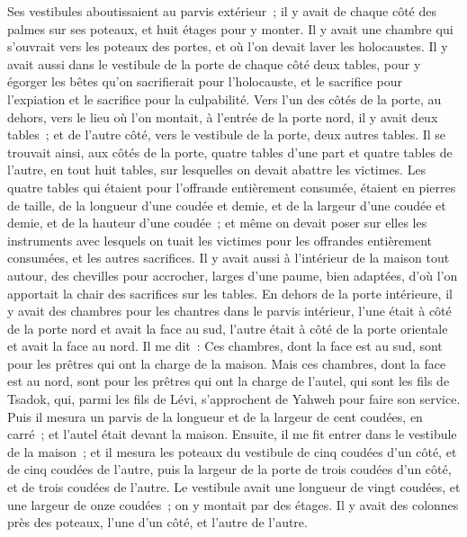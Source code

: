 \begin{multicols}{2}
Ses vestibules aboutissaient au parvis extérieur~; il y avait de chaque côté des palmes sur ses poteaux, et huit étages pour y monter.
Il y avait une chambre qui s'ouvrait vers les poteaux des portes, et où l'on devait laver les holocaustes.
Il y avait aussi dans le vestibule de la porte de chaque côté deux tables, pour y égorger les bêtes qu'on sacrifierait pour l'holocauste, et le sacrifice pour l'expiation et le sacrifice pour la culpabilité.
Vers l'un des côtés de la porte, au dehors, vers le lieu où l'on montait, à l'entrée de la porte nord, il y avait deux tables~; et de l'autre côté, vers le vestibule de la porte, deux autres tables.
Il se trouvait ainsi, aux côtés de la porte, quatre tables d'une part et quatre tables de l'autre, en tout huit tables, sur lesquelles on devait abattre les victimes.
Les quatre tables qui étaient pour l'offrande entièrement consumée, étaient en pierres de taille, de la longueur d'une coudée et demie, et de la largeur d'une coudée et demie, et de la hauteur d'une coudée~; et même on devait poser sur elles les instruments avec lesquels on tuait les victimes pour les offrandes entièrement consumées, et les autres sacrifices.
Il y avait aussi à l'intérieur de la maison tout autour, des chevilles pour accrocher, larges d'une paume, bien adaptées, d'où l'on apportait la chair des sacrifices sur les tables.
En dehors de la porte intérieure, il y avait des chambres pour les chantres dans le parvis intérieur, l'une était à côté de la porte nord et avait la face au sud, l'autre était à côté de la porte orientale et avait la face au nord.
Il me dit~: Ces chambres, dont la face est au sud, sont pour les prêtres qui ont la charge de la maison.
Mais ces chambres, dont la face est au nord, sont pour les prêtres qui ont la charge de l'autel, qui sont les fils de Tsadok, qui, parmi les fils de Lévi, s'approchent de Yahweh pour faire son service.
Puis il mesura un parvis de la longueur et de la largeur de cent coudées, en carré~; et l'autel était devant la maison.
Ensuite, il me fit entrer dans le vestibule de la maison~; et il mesura les poteaux du vestibule de cinq coudées d'un côté, et de cinq coudées de l'autre, puis la largeur de la porte de trois coudées d'un côté, et de trois coudées de l'autre.
Le vestibule avait une longueur de vingt coudées, et une largeur de onze coudées~; on y montait par des étages. Il y avait des colonnes près des poteaux, l'une d'un côté, et l'autre de l'autre.

\end{multicols}
